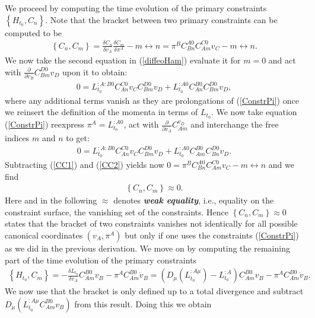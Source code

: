 \documentclass[a4paper,12pt, DIV=14, BCOR=5mm, twoside, headsepline, numbers=noenddot]{scrbook}
\begin{document}
We proceed by computing the time evolution of the primary constraints $\left \{ H_{t_0}, C_n \right \}$. Note that the bracket between two primary constraints can be computed to be 
\begin{align}
    \left \{C_n, C_m \right \} = \frac{\delta C_n}{\delta v_A}\frac{\delta C_m}{\delta \pi^A} - m \leftrightarrow n = \pi^B C_{Bn}^{A0}C_{Am}^{C0} v_C - m \leftrightarrow n .
\end{align}
We now take the second equation in (\ref{diffeoHam}) evaluate it for $m=0$ and act with $\frac{\partial}{\partial \dot{v}_B}C_{Bm}^{D0}v_D$ upon it to obtain: 
\begin{align}\label{CC1}
    0 = L_{t_0}^{:A:B0}C_{An}^{C0}v_CC_{Bm}^{D0}v_D + L_{t_0}^{:A0}C_{An}^{B0}C_{Bm}^{D0}v_D,
\end{align}
where any additional terms vanish as they are prolongations of (\ref{ConstrPi}) once we reinsert the definition of the momenta in terms of $L_{t_0}$. We now take equation (\ref{ConstrPi}) reexpress $\pi^A = L_{t_0}^{:A0}$, act with $\frac{\partial}{\partial v_A}C_{Am}^{v_D}$ and interchange the free indices $m$ and $n$ to get:
\begin{align}\label{CC2}
    0 = L_{t_0}^{:A:B0}C_{An}^{C0}v_CC_{Bm}^{D0}v_D + L_{t_0}^{:A0}C_{Am}^{B0}C_{Bn}^{D0}v_D.
\end{align}
Subtracting (\ref{CC1}) and (\ref{CC2}) yields now $0=\pi^B C_{Bn}^{A0}C_{Am}^{C0} v_C - m \leftrightarrow n$ and we find
\begin{align}
    \left \{C_n, C_m \right \} \approx 0.
\end{align}
Here and in the following $\approx$ denotes \textit{\textbf{weak equality}}, i.e., equality on the constraint surface, the vanishing set of the constraints. Hence $\left \{C_n, C_m \right \} \approx 0$ states that the bracket of two constraints vanishes not identically for all possible canonical coordinates $(v_A,\pi^A)$ but only if one uses the constraints (\ref{ConstrPi}) as we did in the previous derivation. We move on by computing the remaining part of the time evolution of the primary constraints
\begin{align}
    \left \{H_{t_0}, C_m \right \} = -\frac{\delta L_{t_0}}{\delta v_A}C_{Am}^{B0}v_B - \pi^A C_{Am}^{B0}\dot{v}_B = (D_{\mu}(L_{t_0}^{:A\mu}) - L_{t_0}^{:A}) C_{Am}^{B0}v_B - \pi^A C_{Am}^{B0}\dot{v}_B.
\end{align}
We now use that the bracket is only defined up to a total divergence and subtract $D_{\mu}(L_{t_0}^{:A\mu} C_{Am}^{B0}v_B)$ from this result. Doing this we obtain
\end{document}
